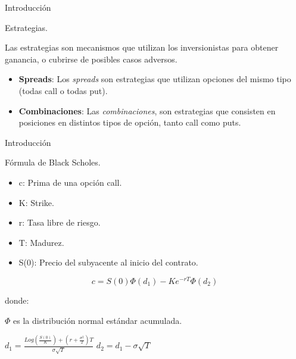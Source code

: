 \documentclass{beamer}
\begin{document}
\begin{frame}{Introducci\'on}

    \begin{block}{Estrategias.}

    Las estrategias son mecanismos que utilizan los inversionistas para obtener ganancia,
    o cubrirse de posibles casos adversos.

    \begin{itemize}
        \item \textbf{Spreads}: Los \textit{spreads} son estrategias que utilizan opciones del mismo tipo (todas call o todas put).
        \item \textbf{Combinaciones}: Las \textit{combinaciones}, son estrategias que consisten en posiciones en distintos tipos de opci\'on, tanto call como puts.
    \end{itemize}    

    \end{block}

\end{frame}

\begin{frame}{Introducci\'on}

    \begin{block}{F\'ormula de Black Scholes.}

    \begin{itemize}
      \item c: Prima de una opci\'on call.
      \item K: Strike.
      \item r: Tasa libre de riesgo.
      \item T: Madurez.
      \item S(0): Precio del subyacente al inicio del contrato.
    \end{itemize}



    \begin{equation}
    c = S(0)\Phi(d_1) - Ke^{-rT}\Phi(d_2)
    \end{equation}

    donde:

    $\Phi$ es la distribuci\'on normal est\'andar acumulada.

    $d_1 = \displaystyle\frac{Log \left(\displaystyle\frac{S(0)}{K}\right)+ 
    \left( r + \displaystyle\frac{\sigma^2}{2}\right)T}{\sigma\sqrt{T}}$
    \qquad  $d_2 = d_1 - \sigma\sqrt{T}$


    \end{block}

\end{frame}
\end{document}
